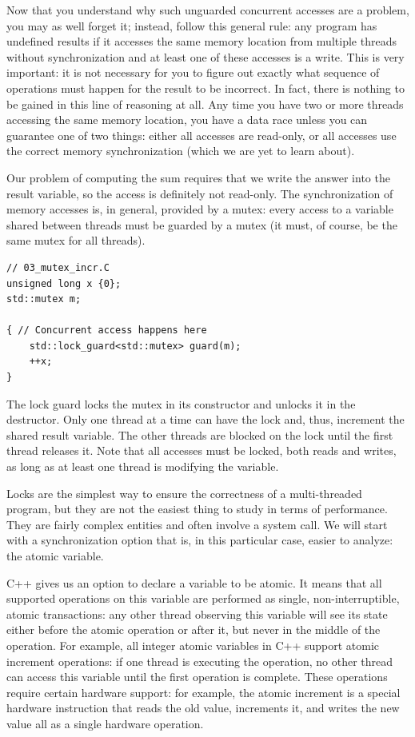 Now that you understand why such unguarded concurrent accesses are a problem, you may as well forget it; instead, follow this general rule: any program has undefined results if it accesses the same memory location from multiple threads without synchronization and at least one of these accesses is a write. This is very important: it is not necessary for you to figure out exactly what sequence of operations must happen for the result to be incorrect. In fact, there is nothing to be gained in this line of reasoning at all. Any time you have two or more threads accessing the same memory location, you have a data race unless you can guarantee one of two things: either all accesses are read-only, or all accesses use the correct memory synchronization (which we are yet to learn about).

Our problem of computing the sum requires that we write the answer into the result variable, so the access is definitely not read-only. The synchronization of memory accesses is, in general, provided by a mutex: every access to a variable shared between threads must be guarded by a mutex (it must, of course, be the same mutex for all threads).

\begin{lstlisting}[style=styleCXX]
// 03_mutex_incr.C
unsigned long x {0};
std::mutex m;

{ // Concurrent access happens here
	std::lock_guard<std::mutex> guard(m);
	++x;
}
\end{lstlisting}

The lock guard locks the mutex in its constructor and unlocks it in the destructor. Only one thread at a time can have the lock and, thus, increment the shared result variable. The other threads are blocked on the lock until the first thread releases it. Note that all accesses must be locked, both reads and writes, as long as at least one thread is modifying the variable.

Locks are the simplest way to ensure the correctness of a multi-threaded program, but they are not the easiest thing to study in terms of performance. They are fairly complex entities and often involve a system call. We will start with a synchronization option that is, in this particular case, easier to analyze: the atomic variable.

C++ gives us an option to declare a variable to be atomic. It means that all supported operations on this variable are performed as single, non-interruptible, atomic transactions: any other thread observing this variable will see its state either before the atomic operation or after it, but never in the middle of the operation. For example, all integer atomic variables in C++ support atomic increment operations: if one thread is executing the operation, no other thread can access this variable until the first operation is complete. These operations require certain hardware support: for example, the atomic increment is a special hardware instruction that reads the old value, increments it, and writes the new value all as a single hardware operation.

